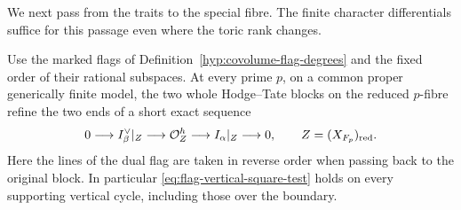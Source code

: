 We next pass from the traits to the special fibre. The finite character differentials suffice for this passage even where the toric rank changes.

\begin{auxlemma}\label{lem:flag-global-reduced-images}
Use the marked flags of Definition~\ref{hyp:covolume-flag-degrees} and the fixed order of their rational subspaces. At every prime \(p\), on a common proper generically finite model, the two whole Hodge--Tate blocks on the reduced \(p\)-fibre refine the two ends of a short exact sequence
\[
 0\longrightarrow I_\beta^\vee|_Z\longrightarrow\mathcal O_Z^h
                  \longrightarrow I_\alpha|_Z\longrightarrow0 ,
 \qquad Z=(X_{\mathbb F_p})_{\rm red}.
\]
Here the lines of the dual flag are taken in reverse order when passing back to the original block. In particular \eqref{eq:flag-vertical-square-test} holds on every supporting vertical cycle, including those over the boundary.
\end{auxlemma}
